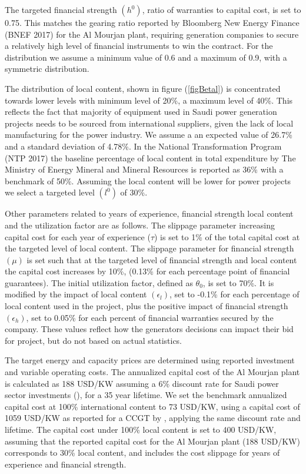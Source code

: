 \documentclass[informs]{informs3}
\begin{document}
The targeted financial strength $(h^{0})$, ratio of warranties to capital cost, is set to 0.75. This matches the gearing ratio reported by Bloomberg New Energy Finance (BNEF 2017) for the Al Mourjan plant, requiring generation companies to secure a relatively high level of financial instruments to win the contract. For the distribution we assume a minimum value of 0.6 and a maximum of 0.9, with a symmetric distribution.

The distribution of local content, shown in figure (\ref{figBetal}) is concentrated towards lower levels with minimum level of 20\%, a maximum level of 40\%. This reflects the fact that majority of equipment used in Saudi power generation projects needs to be sourced from international suppliers, given the lack of local manufacturing for the power industry. We assume a an expected value of 26.7\% and a standard deviation of 4.78\%. In the National Transformation Program (NTP 2017) the baseline percentage of local content in total expenditure by The Ministry of Energy Mineral and Mineral Resources is reported as 36\% with a benchmark of 50\%. Assuming the local content will be lower for power projects we select a targeted level $(l^{0})$ of 30\%. 

Other parameters related to years of experience, financial strength local content and the utilization factor are as follows. The slippage parameter increasing capital cost for each year of experience ($\tau$) is  set to  1\% of the total capital cost at the targeted level of local content. The slippage parameter for financial strength $(\mu)$  is set such that at the targeted level of financial strength and local content the capital cost increases by 10\%, (0.13\% for each percentage point of financial guarantees).  The initial utilization factor, defined as $\theta_0$, is set to 70\%. It is modified by the impact of local content $(\epsilon_l)$, set to -0.1\% for each percentage of local content used in the project,  plus the positive  impact of financial strength $(\epsilon_h)$, set to 0.05\% for each percent of financial warranties secured by the company. These values reflect how the generators decisions can impact their bid for project, but do not based on actual statistics.

The target energy and capacity prices are determined using reported investment and variable operating costs. The annualized capital cost of the Al Mourjan plant is calculated as 188 USD/KW assuming a 6\% discount rate for Saudi power sector investments (\citealp{Matar_et_al_2016}), for a 35 year lifetime. We set the benchmark annualized capital cost at 100\% international content to 73 USD/KW, using a capital cost of 1059 USD/KW as reported for a CCGT by \cite{Rioux_et_al_2017}, applying the same discount rate and lifetime. The capital cost under 100\% local content is set to 400 USD/KW, assuming that the reported capital cost for the Al Mourjan plant (188 USD/KW) corresponds to 30\%  local content, and includes the cost slippage for years of experience and financial strength.
\end{document}
